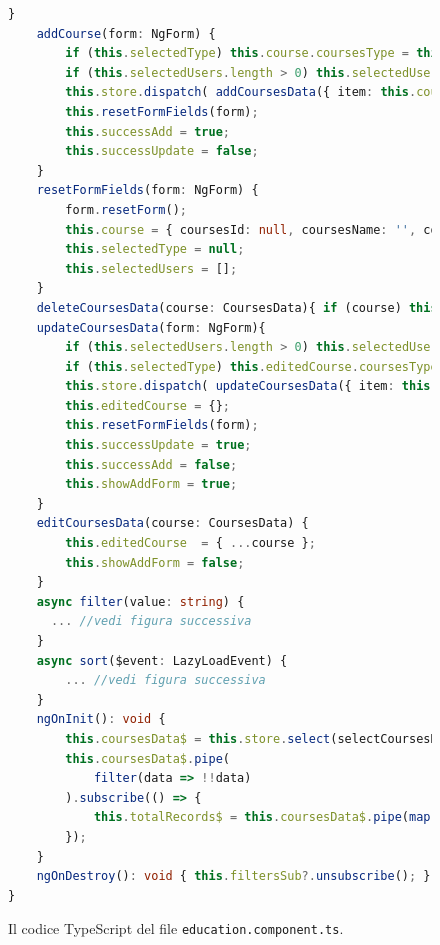 \begin{figure}[H]
\begin{lstlisting}[language=TypeScript, linewidth=20cm, basicstyle=\tiny]
    }
    addCourse(form: NgForm) {
        if (this.selectedType) this.course.coursesType = this.selectedType.types;
        if (this.selectedUsers.length > 0) this.selectedUsers.map((user) => user.usersId);
        this.store.dispatch( addCoursesData({ item: this.course, _id: getRandomId() }) );
        this.resetFormFields(form);
        this.successAdd = true;
        this.successUpdate = false;
    }
    resetFormFields(form: NgForm) {
        form.resetForm();
        this.course = { coursesId: null, coursesName: '', coursesCapacity : null, coursesDate: null };
        this.selectedType = null;
        this.selectedUsers = [];
    }
    deleteCoursesData(course: CoursesData){ if (course) this.store.dispatch( deleteCoursesData({item: course, _id: getRandomId() })); }
    updateCoursesData(form: NgForm){
        if (this.selectedUsers.length > 0) this.selectedUsers.map((user) => user.usersId);
        if (this.selectedType) this.editedCourse.coursesType = this.selectedType.types;
        this.store.dispatch( updateCoursesData({ item: this.editedCourse , _id: getRandomId() }) );
        this.editedCourse = {};
        this.resetFormFields(form);
        this.successUpdate = true;
        this.successAdd = false;
        this.showAddForm = true;
    }
    editCoursesData(course: CoursesData) {
        this.editedCourse  = { ...course };
        this.showAddForm = false;
    }
    async filter(value: string) {
      ... //vedi figura successiva
    }
    async sort($event: LazyLoadEvent) {
        ... //vedi figura successiva
    }
    ngOnInit(): void {
        this.coursesData$ = this.store.select(selectCoursesData).pipe(startWith(this.route.snapshot.data.CoursesData));
        this.coursesData$.pipe(
            filter(data => !!data)
        ).subscribe(() => {
            this.totalRecords$ = this.coursesData$.pipe(map((x) => (x ? (x[0] ? x[0].count : 0) : 0)));
        });
    }
    ngOnDestroy(): void { this.filtersSub?.unsubscribe(); }
}
\end{lstlisting}
\caption{\label{fig:education.ts}Il codice TypeScript del file \texttt{education.component.ts}.}
\end{figure}
